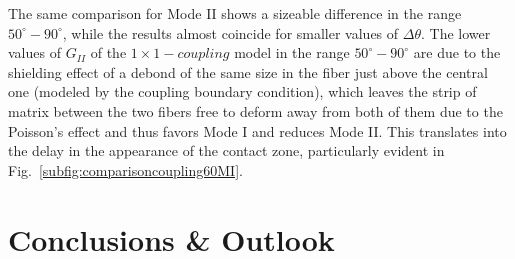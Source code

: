 \documentclass[review]{elsarticle}
\begin{document}
The same comparison for Mode II shows a sizeable difference in the range $50^{\circ}-90^{\circ}$, while the results almost coincide for smaller values of $\Delta\theta$. The lower values of $G_{II}$ of the $1\times 1-coupling$ model in the range $50^{\circ}-90^{\circ}$ are due to the shielding effect of a debond of the same size in the fiber just above the central one (modeled by the coupling boundary condition), which leaves the strip of matrix between the two fibers free to deform away from both of them due to the Poisson’s effect and thus favors Mode I and reduces Mode II. This translates into the delay in the appearance of the contact zone, particularly evident in Fig.~\ref{subfig:comparisoncoupling60MI}.

\section{Conclusions \& Outlook}
\end{document}
